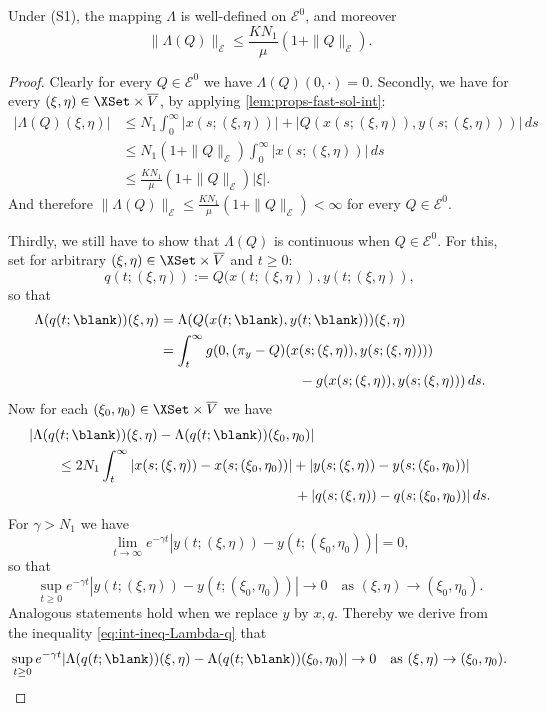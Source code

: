 \documentclass[a4paper]{siamart190516}
\begin{document}
\begin{lemma}\label{lem:red-map-well-defined}
Under (S1), the mapping $\Lambda$ is well-defined on $\mathcal{E}^0$, and moreover
\[
  \| \Lambda(Q) \|_{\mathcal{E}} \leq \frac{K N_1}{\mu} (1+  \| Q \|_{\mathcal{E}}).
\]
\end{lemma}

\begin{proof} 
Clearly for every $Q \in \mathcal{E}^0$ we have $\Lambda(Q)(0,\cdot) = 0$. Secondly,
we have for every $(\xi,\eta) \in \XSet \times \overline{V}$, by applying \cref{lem:props-fast-sol-int}:
\begin{align*}
|\Lambda(Q)(\xi,\eta)| &\leq N_1 \int_0^{\infty}  |x(s; (\xi,\eta))| + |Q(x(s; (\xi,\eta)),y(s;(\xi,\eta)))| \, ds \\
&\leq N_1 (1+  \| Q \|_{\mathcal{E}})  \int_0^{\infty}  |x(s; (\xi,\eta))| \, ds \\
&\leq \frac{K N_1}{\mu} (1+  \| Q \|_{\mathcal{E}})  |\xi|.
\end{align*}
And therefore $\| \Lambda(Q) \|_{\mathcal{E}} \leq \frac{K N_1}{\mu} (1+  \| Q \|_{\mathcal{E}}) < \infty$ for every $Q \in \mathcal{E}^0$.

Thirdly, we still have to show that $\Lambda(Q)$ is continuous when $Q \in \mathcal{E}^0$. For this, set for arbitrary $(\xi,\eta) \in \XSet \times \overline{V}$ and $ t \geq 0$:
\[
q(t;(\xi,\eta)) := Q(x(t;(\xi,\eta)),y(t;(\xi,\eta)),
\]
so that
\begin{align*}
\Lambda (q(t;\blank)) (\xi, \eta) &= \Lambda(Q(x(t;\blank),y(t;\blank)))(\xi,\eta) \\
 &= \int_t^{\infty} g(0, (\pi_y -Q)(x(s; (\xi,\eta)),y(s;(\xi,\eta)))) \\
 &\qquad \qquad \qquad \qquad \qquad- g(x(s; (\xi,\eta)),y(s;(\xi,\eta))) \, ds.
 \end{align*}
Now for each $(\xi_0,\eta_0) \in \XSet \times \overline{V}$ we have
\begin{equation}\label{eq:int-ineq-Lambda-q}
\begin{aligned}
 &| \Lambda (q(t;\blank))(\xi,\eta) -  \Lambda (q(t;\blank))(\xi_0,\eta_0) | \\
 &\qquad  \leq 2 N_1 \int_t^{\infty} |x(s; (\xi,\eta)) - x(s; (\xi_0,\eta_0))| +  |y(s; (\xi,\eta)) - y(s; (\xi_0,\eta_0))| \\
&\qquad \qquad \qquad \qquad \qquad \qquad \qquad \qquad \qquad \quad  +  |q(s; (\xi,\eta)) - q(s; (\xi_0,\eta_0))|   \, ds.
 \end{aligned}
 \end{equation}
 For $\gamma > N_1$ we have
 \[
 \lim_{t \rightarrow \infty} e^{-\gamma t} |y(t; (\xi,\eta)) - y(t; (\xi_0,\eta_0))| = 0,
 \]
 so that
 \[
 \sup_{t \geq 0} e^{-\gamma t} |y(t; (\xi,\eta)) - y(t; (\xi_0,\eta_0))| \rightarrow 0 \quad \text{as } (\xi,\eta) \rightarrow (\xi_0,\eta_0).
 \]
Analogous statements hold when we replace $y$ by $x, q$. Thereby we derive from the inequality \cref{eq:int-ineq-Lambda-q} that
 \[
\sup_{t \geq 0} e^{-\gamma t} | \Lambda (q(t;\blank))(\xi,\eta) -  \Lambda (q(t;\blank))(\xi_0,\eta_0) | \rightarrow 0 \quad \text{as } (\xi,\eta) \rightarrow (\xi_0,\eta_0).
 \]
 

\end{proof}
\end{document}
